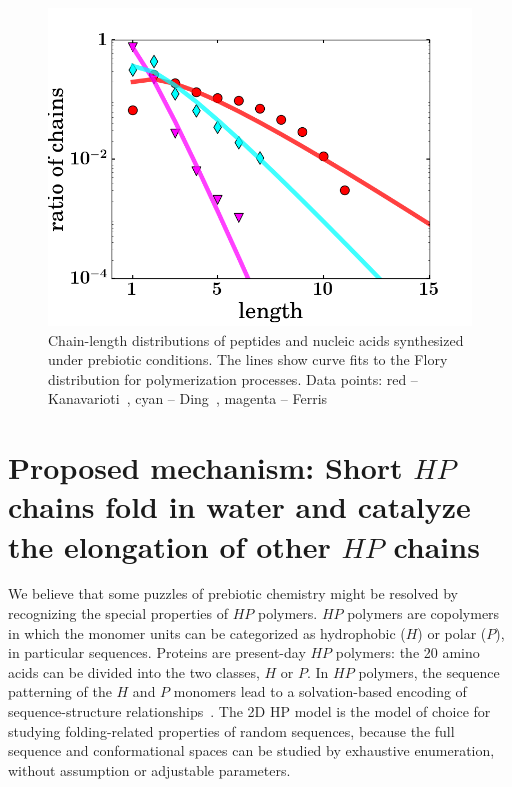 \documentclass[journal=jacsat,manuscript=article,layout=twocolumn]{achemso}
\begin{document}
\begin{figure}[h!]
  \centering
  \includegraphics[width=\columnwidth]{pictures/some_flory.png} 
  \caption{Chain-length distributions of peptides and nucleic acids synthesized under prebiotic 
conditions.  The lines show curve fits to the Flory distribution for polymerization processes. Data 
points: red -- Kanavarioti~\cite{Kanavarioti2001}, cyan -- Ding~\cite{Ding1996}, 
magenta -- Ferris~\cite{Ferris1999}}
  \label{fig:some_flory}
\end{figure}


\section{Proposed mechanism: Short $HP$ chains fold in water and catalyze the elongation of other 
$HP$ chains}

 We believe that some puzzles of prebiotic chemistry might be resolved by recognizing the 
 special properties of $HP$ polymers.  $HP$ polymers are copolymers in which the monomer units can 
be categorized as hydrophobic ($H$) or polar ($P$), in particular sequences.  Proteins are 
present-day $HP$ polymers: the 20 amino acids can be divided into the two classes, $H$ or $P$.  In 
$HP$ polymers, the sequence patterning of the $H$ and $P$ monomers lead to a solvation-based 
encoding of sequence-structure relationships~\cite{Chan1991}.  The 2D HP model is the model of 
choice for studying folding-related properties of random sequences, because the full sequence and 
conformational spaces can be studied by exhaustive enumeration, without assumption or adjustable 
parameters. 
\end{document}
